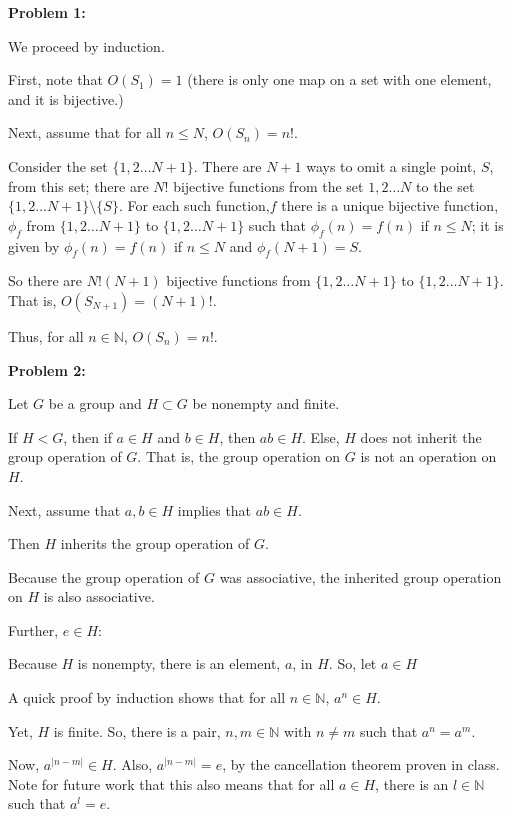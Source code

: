 \documentclass[a4paper,12pt]{article}
\newcommand{\tab}{\hspace{4mm}} %
\newcommand{\shunt}{\vspace{20mm}}
\newcommand{\absval}[1]{\lvert #1 \rvert}
\newcommand{\N}{\mathbb{N}}
\begin{document}
{\bf Problem 1:}

We proceed by induction. 

First, note that $O(S_1) = 1$ (there is only one map on a set with one element, and it is bijective.)

Next, assume that for all $n \leq N$, $O(S_n) = n!$.

\tab Consider the set $\{1, 2 \ldots N+1\}$. There are $N+1$ ways to omit a single point, $S$, from this set; there are $N!$ bijective functions from the set ${1, 2 \ldots N}$ to the set $\{1, 2 \ldots N+1\} \setminus \{S\}$. For each such function,$f$ there is a unique bijective function, $\phi_f$ from $\{1, 2 \ldots N+1\}$ to $\{1, 2 \ldots N+1\}$ such that $\phi_f(n) = f(n)$ if $n \leq N$; it is given by $\phi_f(n) = f(n)$ if $n \leq N$ and $\phi_f(N+1) = S$.

\tab So there are $N!(N+1)$ bijective functions from $\{1, 2 \ldots N+1\}$ to $\{1, 2 \ldots N+1\}$. That is, $O(S_{N+1}) = (N+1)!$.

Thus, for all $n \in \N$, $O(S_n) = n!$.

\shunt

{\bf Problem 2:}

Let $G$ be a group and $H \subset G$ be nonempty and finite.

If $H < G$, then if $a \in H$ and $b \in H$, then $ab \in H$. Else, $H$ does not inherit the group operation of $G$. That is, the group operation on $G$ is not an operation on $H$.

Next, assume that $a,b \in H$ implies that $ab \in H$.

\tab Then $H$ inherits the group operation of $G$.

\tab Because the group operation of $G$ was associative, the inherited group operation on $H$ is also associative.

\tab Further, $e \in H$:

\tab \tab Because $H$ is nonempty, there is an element, $a$, in $H$. So, let $a \in H$

\tab \tab A quick proof by induction shows that for all $n \in \N$, $a^n \in H$.

\tab \tab Yet, $H$ is finite. So, there is a pair, $n, m \in \N$ with $n \neq m$ such that $a^n = a^m$.

\tab \tab Now, $a^{\absval{n-m}} \in H$. Also, $a^{\absval{n-m}} = e$, by the cancellation theorem proven in class. Note for future work that this also means that for all $a \in H$, there is an $l \in \N$ such that $a^l = e$.
\end{document}

